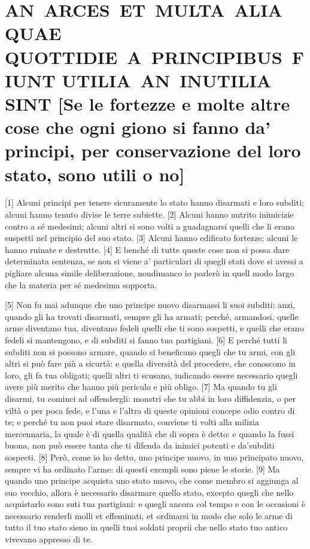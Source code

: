 \quebra\section{AN~ARCES~ET~MULTA~ALIA~QUAE QUOTTIDIE~A~PRINCIPIBUS~FIUNT UTILIA~AN~INUTILIA SINT\break
{[}Se le fortezze e molte altre cose che ogni giono si fanno da'
principi, per conservazione del loro stato, sono utili o no{]}}

{[}1{]} Alcuni principi per tenere sicuramente lo stato hanno disarmati
e loro subditi; alcuni hanno tenuto divise le terre subiette. {[}2{]}
Alcuni hanno nutrito inimicizie contro a sé medesimi; alcuni altri si
sono volti a guadagnarsi quelli che li erano suspetti nel principio del
suo stato. {[}3{]} Alcuni hanno edificato fortezze; alcuni le hanno
ruinate e destrutte. {[}4{]} E benché di tutte queste cose non si possa
dare determinata sentenza, se non si viene a' particulari di quegli
stati dove si avessi a pigliare alcuna simile deliberazione, nondimanco
io parlerò in quell modo largo che la materia per sé medesima sopporta.

{[}5{]} Non fu mai adunque che uno principe nuovo disarmassi li suoi
subditi: anzi, quando gli ha trovati disarmati, sempre gli ha armati;
perché, armandosi, quelle arme diventano tua, diventano fedeli quelli
che ti sono sospetti, e quelli che erano fedeli si mantengono, e di
subditi si fanno tua partigiani. {[}6{]} E perché tutti li subditi non
si possono armare, quando si beneficano quegli che tu armi, con gli
altri si può fare più a sicurtà: e quella diversità del procedere, che
conoscono in loro, gli fa tua obligati; quelli altri ti scusano,
iudicando essere necessario quegli avere più merito che hanno più
periculo e più obligo. {[}7{]} Ma quando tu gli disarmi, tu cominci ad
offendergli: monstri che tu abbi in loro diffidenzia, o per viltà o per
poca fede, e l'una e l'altra di queste opinioni concepe odio contro di
te; e perché tu non puoi stare disarmato, conviene ti volti alla milizia
mercennaria, la quale è di quella qualità che di sopra è detto: e quando
la fussi buona, non può essere tanta che ti difenda da inimici potenti e
da'subditi sospecti. {[}8{]} Però, come io ho detto, uno principe nuovo,
in uno principato nuovo, sempre vi ha ordinato l'arme: di questi exempli
sono piene le storie. {[}9{]} Ma quando uno principe acquista uno stato
nuovo, che come membro si aggiunga al suo vecchio, allora è necessario
disarmare quello stato, excepto quegli che nello acquistarlo sono suti
tua partigiani: e quegli ancora col tempo e con le occasioni è
necessario renderli molli et effeminati, et ordinarsi in modo che solo
le arme di tutto il tuo stato sieno in quelli tuoi soldati proprii che
nello stato tuo antico vivevano appresso di te.

